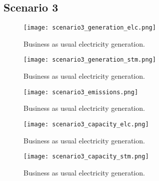 \subsection{Scenario 3}
\begin{figure}[H]
	\texttt{[image: scenario3\_generation\_elc.png]}
	\caption{Business as usual electricity generation.}
	\label{fig:}
\end{figure}
\begin{figure}[H]
	\texttt{[image: scenario3\_generation\_stm.png]}
	\caption{Business as usual electricity generation.}
	\label{fig:}
\end{figure}
\begin{figure}[H]
	\texttt{[image: scenario3\_emissions.png]}
	\caption{Business as usual electricity generation.}
	\label{fig:}
\end{figure}
\begin{figure}[H]
	\texttt{[image: scenario3\_capacity\_elc.png]}
	\caption{Business as usual electricity generation.}
	\label{fig:}
\end{figure}
\begin{figure}[H]
	\texttt{[image: scenario3\_capacity\_stm.png]}
	\caption{Business as usual electricity generation.}
	\label{fig:}
\end{figure}
